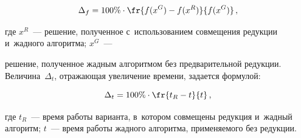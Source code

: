 \begin{equation*}

\label{eq:delta_f}

    \Delta_f = 100\% \cdot \fr{f(x^G) - f(x^R)}{f(x^G)}\,,

\end{equation*}




















\noindent

где $x^R$~--- решение, полученное с~использованием совмещения редукции и~жад\-но\-го алгоритма; $x^G$~--- 

решение, полученное жад\-ным алгоритмом без предварительной редукции. Величина~$\Delta_t$, от\-ра\-жа\-ющая увеличение времени, задается формулой:

\begin{equation*}

\label{eq:delta_t}

    \Delta_t = 100\% \cdot \fr{t_R - t}{t} \,,

\end{equation*}

где $t_R$~--- время работы варианта, в~котором совмещены редукция и~жадный алгоритм; $t$~--- время работы жад\-но\-го алгоритма, при\-ме\-ня\-емо\-го без редукции.



